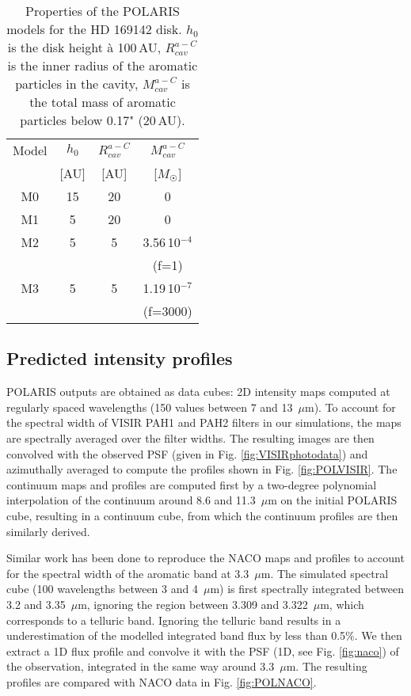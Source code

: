 \documentclass{aa}
\newcommand{\mic}{~$\mu$m\xspace}
\begin{document}
\begin{table}[!ht]
\centering
\caption{Properties of the POLARIS models for the HD 169142 disk. $h_0$ is the disk height à 100\,AU, $R_{cav}^{a-C}$ is the inner radius of the aromatic particles in the cavity, $M_{cav}^{a-C}$ is the total mass of aromatic particles below 0.17" (20\,AU).}
\label{tab:Mimodels}
\begin{tabular}{cccc}
        \hline
         Model&$h_0$&$R_{cav}^{a-C}$&$M_{cav}^{a-C}$\\
         &[AU]&[AU]&[$M_{\astrosun}$]\\
         \hline 
         M0&15&20&0\\
         M1&5&20&0\\
         M2&5&5&3.56\,10$^{-4}$\\
         &&&(f=1)\\
         M3&5&5&1.19\,10$^{-7}$\\
         &&&(f=3000)\\
         \hline
\end{tabular}
\end{table}


\subsection{Predicted intensity profiles}
POLARIS outputs are obtained as data cubes: 2D intensity maps computed at regularly spaced wavelengths (150 values between 7 and 13\mic). To account for the spectral width of VISIR PAH1 and PAH2 filters in our simulations, the maps are spectrally averaged over the filter widths. The resulting images are then convolved with the observed PSF (given in Fig. \ref{fig:VISIRphotodata}) and azimuthally averaged to compute the profiles shown in Fig. \ref{fig:POLVISIR}. The continuum maps and profiles are computed first by a two-degree polynomial interpolation of the continuum around 8.6 and 11.3\mic on the initial POLARIS cube, resulting in a continuum cube, from which the continuum profiles are then similarly derived.

Similar work has been done to reproduce the NACO maps and profiles to account for the spectral width of the aromatic band at 3.3\mic. The simulated spectral cube (100 wavelengths between 3 and 4\mic) is first spectrally integrated between 3.2 and 3.35\mic, ignoring the region between 3.309 and 3.322\mic, which corresponds to a telluric band. Ignoring the telluric band results in a underestimation of the modelled integrated band flux by less than 0.5\%. We then extract a 1D flux profile and convolve it with the PSF (1D, see Fig. \ref{fig:naco}) of the observation, integrated in the same way around 3.3\mic. The resulting profiles are compared with NACO data in Fig. \ref{fig:POLNACO}. 
\end{document}
